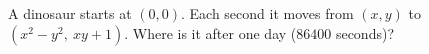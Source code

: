 A dinosaur starts at $(0,0)$. Each second it moves from $(x,y)$ to $\left(x^2-y^2,\ xy+1\right)$. Where is it after one day ($86400$ seconds)?
